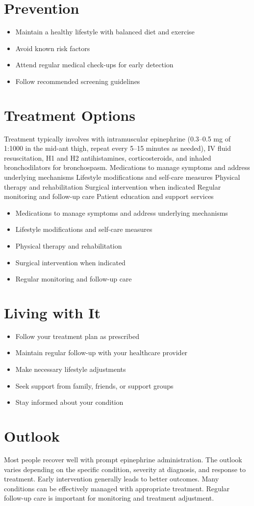 \section{Prevention}
\begin{itemize}[noitemsep]
  \item Maintain a healthy lifestyle with balanced diet and exercise
  \item Avoid known risk factors
  \item Attend regular medical check-ups for early detection
  \item Follow recommended screening guidelines
\end{itemize}
\section{Treatment Options}
Treatment typically involves with intramuscular epinephrine (0.3--0.5 mg of 1:1000 in the mid-ant thigh, repeat every 5--15 minutes as needed), IV fluid resuscitation, H1 and H2 antihistamines, corticosteroids, and inhaled bronchodilators for bronchospasm. Medications to manage symptoms and address underlying mechanisms Lifestyle modifications and self-care measures Physical therapy and rehabilitation Surgical intervention when indicated Regular monitoring and follow-up care Patient education and support services

\begin{itemize}[noitemsep]
  \item Medications to manage symptoms and address underlying mechanisms
  \item Lifestyle modifications and self-care measures
  \item Physical therapy and rehabilitation
  \item Surgical intervention when indicated
  \item Regular monitoring and follow-up care
\end{itemize}
\section{Living with It}
\begin{itemize}[noitemsep]
  \item Follow your treatment plan as prescribed
  \item Maintain regular follow-up with your healthcare provider
  \item Make necessary lifestyle adjustments
  \item Seek support from family, friends, or support groups
  \item Stay informed about your condition
\end{itemize}
\section{Outlook}
Most people recover well with prompt epinephrine administration. The outlook varies depending on the specific condition, severity at diagnosis, and response to treatment. Early intervention generally leads to better outcomes. Many conditions can be effectively managed with appropriate treatment. Regular follow-up care is important for monitoring and treatment adjustment.
